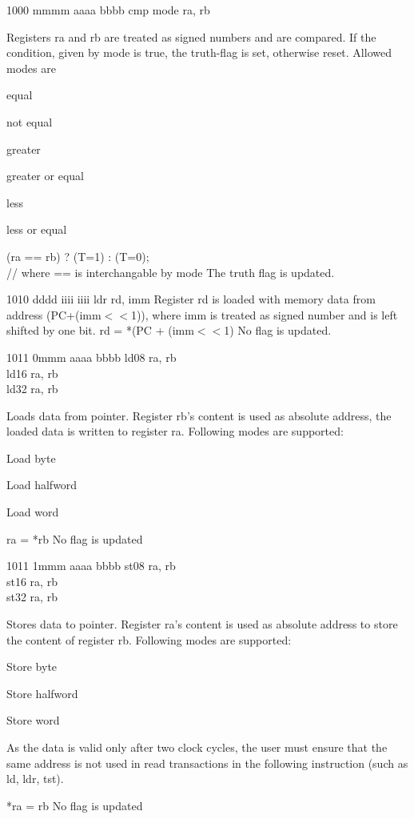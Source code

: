 	{1000 mmmm aaaa bbbb}
	{cmp mode ra, rb}
	{Registers ra and rb are treated as signed numbers and are compared. If the condition, given by mode is true, the truth-flag is set, otherwise reset. Allowed modes are\begin{description}\nolistskip
	\item[0000, eq]equal
	\item[1000, neq]not equal
	\item[0010, gg]greater
	\item[0001, ge]greater or equal
	\item[1001, ll]less
	\item[1010, le]less or equal
	\end{description}}
	{(ra == rb) ? (T=1) : (T=0);\\// where == is interchangable by mode}
	{The truth flag is updated.}

	{1010 dddd iiii iiii}
	{ldr rd, imm}
	{Register rd is loaded with memory data from address (PC+(imm$<<$1)), where imm is treated as signed number and is left shifted by one bit.}
	{rd = *(PC + (imm$<<$1)}
	{No flag is updated.}

	{1011 0mmm aaaa bbbb}
	{ld08 ra, rb\\ld16 ra, rb\\ld32 ra, rb}
	{Loads data from pointer. Register rb's content is used as absolute address, the loaded data is written to register ra. Following modes are supported:
	\begin{description}
	\nolistskip
	\item[000] Load byte
	\item[001] Load halfword
	\item[010] Load word
\end{description}		
	}
	{ra = *rb}
	{No flag is updated}
	
	{1011 1mmm aaaa bbbb}
	{st08 ra, rb\\st16 ra, rb\\st32 ra, rb}
	{Stores data to pointer. Register ra's content is used as absolute address to store the content of register rb. Following modes are supported:
	\begin{description}
	\nolistskip
	\item[000] Store byte
	\item[001] Store halfword
	\item[010] Store word
\end{description}
	As the data is valid only after two clock cycles, the user must ensure that the same address is not used in read transactions in the following instruction (such as ld, ldr, tst). 
	}
	{*ra = rb}
	{No flag is updated}

